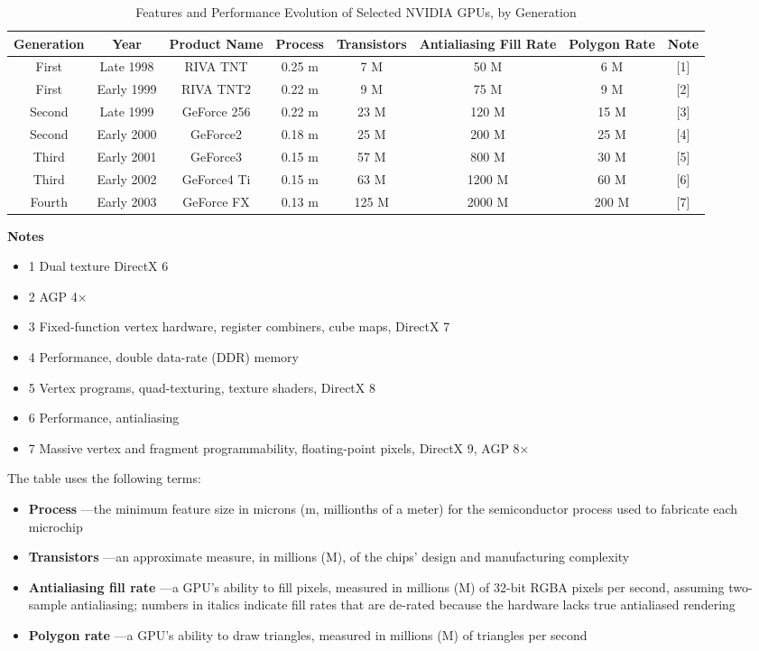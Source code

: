 \documentclass{book}
\begin{document}
\FloatBarrier
\begin{table}
\centering
\begin{tabular}{ |c|c|c|c|c|c|c|c| } 
 \hline
 Generation & Year & Product Name & Process & Transistors & Antialiasing Fill Rate & Polygon Rate & Note \\
 \hline
 First & Late 1998 & RIVA TNT & 0.25 m & 7 M & 50 M & 6 M & [1] \\
 First & Early 1999 & RIVA TNT2 & 0.22 m & 9 M & 75 M & 9 M & [2] \\
 Second & Late 1999 & GeForce 256 & 0.22 m & 23 M & 120 M & 15 M & [3] \\
 Second & Early 2000 & GeForce2 & 0.18 m & 25 M & 200 M & 25 M & [4] \\
 Third & Early 2001 & GeForce3 & 0.15 m & 57 M & 800 M & 30 M & [5] \\
 Third & Early 2002 & GeForce4 Ti & 0.15 m & 63 M & 1200 M & 60 M & [6] \\
 Fourth & Early 2003 & GeForce FX & 0.13 m & 125 M & 2000 M & 200 M & [7] \\
 \hline
\end{tabular}
\caption{Features and Performance Evolution of Selected NVIDIA GPUs, by Generation}
\label{table:1-1}

\textbf{Notes}
\begin{itemize}
\item[] 1 Dual texture DirectX 6
\item[] 2 AGP 4×
\item[] 3 Fixed-function vertex hardware, register combiners, cube maps, DirectX 7
\item[] 4 Performance, double data-rate (DDR) memory
\item[] 5 Vertex programs, quad-texturing, texture shaders, DirectX 8
\item[] 6 Performance, antialiasing
\item[] 7 Massive vertex and fragment programmability, floating-point pixels, DirectX 9, AGP 8×
\end{itemize}

\end{table}
\FloatBarrier

The table uses the following terms:

\FloatBarrier
\begin{itemize}
    \item \textbf{Process} —the minimum feature size in microns (m, millionths of a meter) for the semiconductor process used to fabricate each microchip
    \item \textbf{Transistors} —an approximate measure, in millions (M), of the chips' design and manufacturing complexity
    \item \textbf{Antialiasing fill rate} —a GPU's ability to fill pixels, measured in millions (M) of 32-bit RGBA pixels per second, assuming two-sample antialiasing; numbers in italics indicate fill rates that are de-rated because the hardware lacks true antialiased rendering
    \item \textbf{Polygon rate} —a GPU's ability to draw triangles, measured in millions (M) of triangles per second
\end{itemize}
\FloatBarrier
\end{document}
